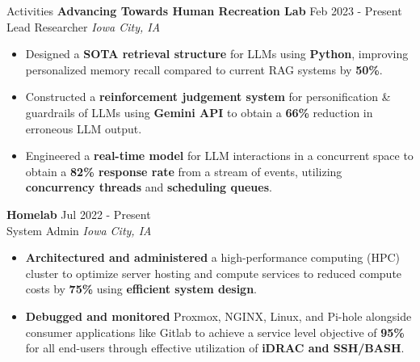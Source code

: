 \documentclass{resume} %
\begin{document}
\begin{rSection}{Activities}
  \textbf{Advancing Towards Human Recreation Lab} \hfill Feb 2023 - Present\\
  Lead Researcher \hfill \textit{Iowa City, IA}
   \begin{itemize}
    \itemsep -3pt {} 
    \item Designed a \textbf{SOTA retrieval structure} for LLMs using \textbf{Python}, improving personalized memory recall compared to current RAG systems by \textbf{50\%}. 
    \item Constructed a \textbf{reinforcement judgement system} for personification \& guardrails of LLMs using \textbf{Gemini API} to obtain a \textbf{66\%} reduction in erroneous LLM output.
    \item Engineered a \textbf{real-time model} for LLM interactions in a concurrent space to obtain a \textbf{82\% response rate} from a stream of events, utilizing \textbf{concurrency threads} and \textbf{scheduling queues}.
    \end{itemize}

    \textbf{Homelab} \hfill Jul 2022 - Present\\
    System Admin \hfill \textit{Iowa City, IA}
     \begin{itemize}
      \itemsep -3pt {} 
      \item \textbf{Architectured and administered} a high-performance computing (HPC) cluster to optimize server hosting and compute services to reduced compute costs by \textbf{75\%} using \textbf{efficient system design}.
      \item \textbf{Debugged and monitored} Proxmox, NGINX, Linux, and Pi-hole alongside consumer applications like Gitlab to achieve a service level objective of \textbf{95\%} for all end-users through effective utilization of \textbf{iDRAC and SSH/BASH}.
      \end{itemize}
  
\end{rSection} 

\end{document}
